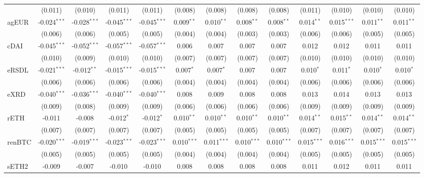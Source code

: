 \begin{table}[!htbp]
\begin{tabular}{@{\extracolsep{5pt}}lcccccccccccc}
  & (0.011) & (0.010) & (0.011) & (0.011) & (0.008) & (0.008) & (0.008) & (0.008) & (0.011) & (0.010) & (0.010) & (0.010) \\
 agEUR & -0.024$^{***}$ & -0.028$^{***}$ & -0.045$^{***}$ & -0.045$^{***}$ & 0.009$^{**}$ & 0.010$^{**}$ & 0.008$^{**}$ & 0.008$^{**}$ & 0.014$^{**}$ & 0.015$^{***}$ & 0.011$^{**}$ & 0.011$^{**}$ \\
  & (0.006) & (0.006) & (0.005) & (0.005) & (0.004) & (0.004) & (0.003) & (0.003) & (0.006) & (0.006) & (0.005) & (0.005) \\
 cDAI & -0.045$^{***}$ & -0.052$^{***}$ & -0.057$^{***}$ & -0.057$^{***}$ & 0.006$^{}$ & 0.007$^{}$ & 0.007$^{}$ & 0.007$^{}$ & 0.012$^{}$ & 0.012$^{}$ & 0.011$^{}$ & 0.011$^{}$ \\
  & (0.010) & (0.009) & (0.010) & (0.010) & (0.007) & (0.007) & (0.007) & (0.007) & (0.010) & (0.010) & (0.010) & (0.010) \\
 eRSDL & -0.021$^{***}$ & -0.012$^{**}$ & -0.015$^{***}$ & -0.015$^{***}$ & 0.007$^{*}$ & 0.007$^{*}$ & 0.007$^{}$ & 0.007$^{}$ & 0.010$^{*}$ & 0.011$^{*}$ & 0.010$^{*}$ & 0.010$^{*}$ \\
  & (0.006) & (0.006) & (0.006) & (0.006) & (0.004) & (0.004) & (0.004) & (0.004) & (0.006) & (0.006) & (0.006) & (0.006) \\
 eXRD & -0.040$^{***}$ & -0.036$^{***}$ & -0.040$^{***}$ & -0.040$^{***}$ & 0.008$^{}$ & 0.009$^{}$ & 0.008$^{}$ & 0.008$^{}$ & 0.013$^{}$ & 0.014$^{}$ & 0.013$^{}$ & 0.013$^{}$ \\
  & (0.009) & (0.008) & (0.009) & (0.009) & (0.006) & (0.006) & (0.006) & (0.006) & (0.009) & (0.009) & (0.009) & (0.009) \\
 rETH & -0.011$^{}$ & -0.008$^{}$ & -0.012$^{*}$ & -0.012$^{*}$ & 0.010$^{**}$ & 0.010$^{**}$ & 0.010$^{**}$ & 0.010$^{**}$ & 0.014$^{**}$ & 0.015$^{**}$ & 0.014$^{**}$ & 0.014$^{**}$ \\
  & (0.007) & (0.007) & (0.007) & (0.007) & (0.005) & (0.005) & (0.005) & (0.005) & (0.007) & (0.007) & (0.007) & (0.007) \\
 renBTC & -0.020$^{***}$ & -0.019$^{***}$ & -0.023$^{***}$ & -0.023$^{***}$ & 0.010$^{***}$ & 0.011$^{***}$ & 0.010$^{***}$ & 0.010$^{***}$ & 0.015$^{***}$ & 0.016$^{***}$ & 0.015$^{***}$ & 0.015$^{***}$ \\
  & (0.005) & (0.005) & (0.005) & (0.005) & (0.004) & (0.004) & (0.004) & (0.004) & (0.005) & (0.005) & (0.005) & (0.005) \\
 sETH2 & -0.009$^{}$ & -0.007$^{}$ & -0.010$^{}$ & -0.010$^{}$ & 0.008$^{}$ & 0.008$^{}$ & 0.008$^{}$ & 0.008$^{}$ & 0.011$^{}$ & 0.012$^{}$ & 0.011$^{}$ & 0.011$^{}$ \\

\end{tabular}
\end{table}
